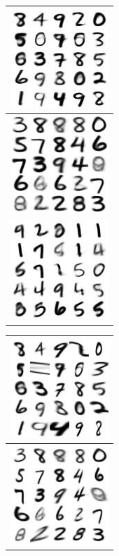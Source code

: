 \documentclass[letterpaper, twoside]{article}
\begin{document}
  \begin{figure}[H]
  \centering
  \begin{minipage}{.5\textwidth}
  \centering
  \begin{tabular}{|@{}c@{}|}
  \hline
  \includegraphics[scale=1]{manifold_ident_60.jpg}\\ \hline
  \includegraphics[scale=1]{manifold_ident_61.jpg}\\ \hline
  \includegraphics[scale=1]{manifold_ident_62.jpg}\\\hline
  \end{tabular}
  \end{minipage}%
  \begin{minipage}{.5\textwidth}
  \centering
  \begin{tabular}{|@{}c@{}|}
  \hline
  \includegraphics[scale=1]{manifold_sig_60.jpg}\\ \hline
  \includegraphics[scale=1]{manifold_sig_61.jpg}\\ \hline

\end{tabular}
\end{minipage}
\end{figure}
\end{document}
